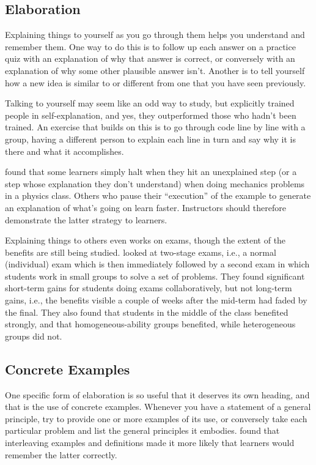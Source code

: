 \subsection*{Elaboration}

Explaining things to yourself as you go through them helps you
understand and remember them.  One way to do this is to follow up each
answer on a practice quiz with an explanation of why that answer is
correct, or conversely with an explanation of why some other plausible
answer isn't.  Another is to tell yourself how a new idea is similar
to or different from one that you have seen previously.

Talking to yourself may seem like an odd way to study, but
\cite{Biel1995} explicitly trained people in self-explanation, and
yes, they outperformed those who hadn't been trained.  An exercise
that builds on this is to go through code line by line with a group,
having a different person to explain each line in turn and say why it
is there and what it accomplishes.

\cite{Chi1989} found that some learners simply halt when they hit an
unexplained step (or a step whose explanation they don't understand)
when doing mechanics problems in a physics class.  Others who pause
their ``execution'' of the example to generate an explanation of
what's going on learn faster.  Instructors should therefore
demonstrate the latter strategy to learners.

Explaining things to others even works on exams, though the extent of
the benefits are still being studied.  \cite{Cao2017a,Cao2017b} looked
at two-stage exams, i.e., a normal (individual) exam which is then
immediately followed by a second exam in which students work in small
groups to solve a set of problems.  They found significant short-term
gains for students doing exams collaboratively, but not long-term
gains, i.e., the benefits visible a couple of weeks after the mid-term
had faded by the final.  They also found that students in the middle
of the class benefited strongly, and that homogeneous-ability groups
benefited, while heterogeneous groups did not.

\subsection*{Concrete Examples}

One specific form of elaboration is so useful that it deserves its own
heading, and that is the use of concrete examples.  Whenever you have
a statement of a general principle, try to provide one or more
examples of its use, or conversely take each particular problem and
list the general principles it embodies.  \cite{Raws2014} found that
interleaving examples and definitions made it more likely that
learners would remember the latter correctly.


